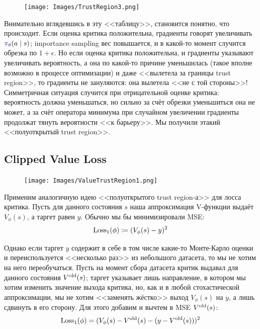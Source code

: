 \begin{figure}
\vspace{-0.4cm}
\centering
\texttt{[image: Images/TrustRegion3.png]}
\vspace{-0.4cm}
\end{figure}
Внимательно вглядевшись в эту <<таблицу>>, становится понятно, что происходит. Если оценка критика положительна, градиенты говорят увеличивать $\textcolor{ChadBlue}{\pi_\theta}(a \mid s)$; importance sampling вес повышается, и в какой-то момент случится обрезка по $1 + \epsilon$. Но если оценка критика положительна, и градиенты указывают увеличивать вероятность, а она по какой-то причине уменьшилась (такое вполне возможно в процессе оптимизации) и даже <<вылетела за границы trust region>>, то градиенты не зануляются: она вылетела <<не с той стороны>>! Симметричная ситуация случится при отрицательной оценке критика: вероятность должна уменьшаться, но сильно за счёт обрезки уменьшиться она не может, а за счёт оператора минимума при случайном увеличении градиенты продолжат тянуть вероятности <<к барьеру>>. Мы получили этакий <<полуоткрытый trust region>>.

\subsection{Clipped Value Loss}

\begin{figure}
\vspace{-0.5cm}
\centering
\texttt{[image: Images/ValueTrustRegion1.png]}
\end{figure}
Применим аналогичную идею <<полуоткрытого trust region-а>> для лосса критика. Пусть для данного состояния $s$ наша аппроксимация V-функции выдаёт $V_{\phi}(s)$, а таргет равен $y$. Обычно мы бы минимизировали MSE:
$$\operatorname{Loss}_1(\phi) \coloneqq (V_{\phi}(s) - y)^2$$

Однако если таргет $y$ содержит в себе в том числе какие-то Монте-Карло оценки и переиспользуется <<несколько раз>> из небольшого датасета, то мы не хотим на него переобучаться. Пусть на момент сбора датасета критик выдавал для данного состояния $V^{\mathrm{old}}(s)$; таргет указывает лишь направление, в котором мы хотим изменить значение выхода критика, но, как и в любой стохастической аппроксимации, мы не хотим <<заменять жёстко>> выход $V_{\phi}(s)$ на $y$, а лишь сдвинуть в его сторону. Для этого добавим и вычтем в MSE $V^{\mathrm{old}}(s)$:
$$\operatorname{Loss}_1(\phi) = (V_{\phi}(s) - V^{\mathrm{old}}(s) - (y - V^{\mathrm{old}}(s)))^2$$

